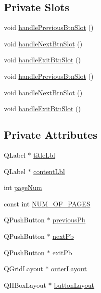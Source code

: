 \subsection*{Private Slots}
\begin{DoxyCompactItemize}
\item 
void \hyperlink{class_help_gui_af309af2990c52916eab0a40510542802}{handle\-Previous\-Btn\-Slot} ()
\item 
void \hyperlink{class_help_gui_a510f3aea4e1e66f3d178a91a3439e1ea}{handle\-Next\-Btn\-Slot} ()
\item 
void \hyperlink{class_help_gui_a106eb2542ed277a6b0bedf40da4d2cf7}{handle\-Exit\-Btn\-Slot} ()
\item 
void \hyperlink{class_help_gui_af309af2990c52916eab0a40510542802}{handle\-Previous\-Btn\-Slot} ()
\item 
void \hyperlink{class_help_gui_a510f3aea4e1e66f3d178a91a3439e1ea}{handle\-Next\-Btn\-Slot} ()
\item 
void \hyperlink{class_help_gui_a106eb2542ed277a6b0bedf40da4d2cf7}{handle\-Exit\-Btn\-Slot} ()
\end{DoxyCompactItemize}
\subsection*{Private Attributes}
\begin{DoxyCompactItemize}
\item 
Q\-Label $\ast$ \hyperlink{class_help_gui_a68128f3db7b1af2a517eda58f398828f}{title\-Lbl}
\item 
Q\-Label $\ast$ \hyperlink{class_help_gui_af8c1a67033fe6ad4db009074e0eec724}{content\-Lbl}
\item 
int \hyperlink{class_help_gui_adf3a3c855433b0f1a91539782a22cc23}{page\-Num}
\item 
const int \hyperlink{class_help_gui_a00d2ca54630e51b77a14b61a59fb0994}{N\-U\-M\-\_\-\-O\-F\-\_\-\-P\-A\-G\-E\-S}
\item 
Q\-Push\-Button $\ast$ \hyperlink{class_help_gui_ae690b86677b85526a81c72aaf4d41c08}{previous\-Pb}
\item 
Q\-Push\-Button $\ast$ \hyperlink{class_help_gui_af2176ceb00942f14e24a1b8c3b2a7f6f}{next\-Pb}
\item 
Q\-Push\-Button $\ast$ \hyperlink{class_help_gui_ab4363d4bdda8ccaa029619c73696a2ed}{exit\-Pb}
\item 
Q\-Grid\-Layout $\ast$ \hyperlink{class_help_gui_ae1d87eba11c15aae63f5970f847fb71f}{outer\-Layout}
\item 
Q\-H\-Box\-Layout $\ast$ \hyperlink{class_help_gui_a79e78c0205577c14278ec3eabc79a916}{button\-Layout}
\end{DoxyCompactItemize}


